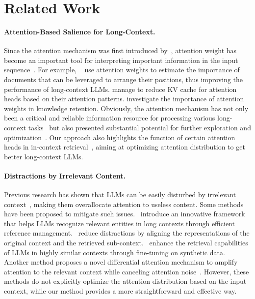 \section{Related Work}
\paragraph{Attention-Based Salience for Long-Context.} Since the attention mechanism was first introduced by~\citep{bahdanau2014neural}, attention weight has become an important tool for interpreting important information in the input sequence~\citep{serrano-smith-2019-attention, ferrando2024primer}. For example, ~\citet{peysakhovich2023attention} use attention weights to estimate the importance of documents that can be leveraged to arrange their positions, thus improving the performance of long-context LLMs. \citet{xiao2024duoattention} manage to reduce KV cache for attention heads based on their attention patterns. \citet{he2024seekr} investigate the importance of attention weights in knowledge retention. Obviously, the attention mechanism has not only been a critical and reliable information resource for processing various long-context tasks~\cite{xiaoefficient, chen2024attention} but also presented substantial potential for further exploration and optimization~\citep{wu2024retrieval, lu2024longheads, he-etal-2024-never}. Our approach also highlights the function of certain attention heads in in-context retrieval~\citep{ram2023context}, aiming at optimizing attention distribution to get better long-context LLMs.

\paragraph{Distractions by Irrelevant Content.} Previous research has shown that LLMs can be easily disturbed by irrelevant context~\cite{shi2023large, wu2024easily}, making them overallocate attention to useless content. Some methods have been proposed to mitigate such issues.~\citet{liu2024bridging} introduce an innovative framework that helps LLMs recognize relevant entities in long contexts through efficient reference management.~\citet{wu2024reducing} reduce distractions by aligning the representations of the original context and the retrieved sub-context.~\citet{xiong2024artificial} enhance the retrieval capabilities of LLMs in highly similar contexts through fine-tuning on synthetic data. Another method proposes a novel differential attention mechanism to amplify attention to the relevant context while canceling attention noise~\citep{ye2024differential}. However, these methods do not explicitly optimize the attention distribution based on the input context, while our method provides a more straightforward and effective way.


